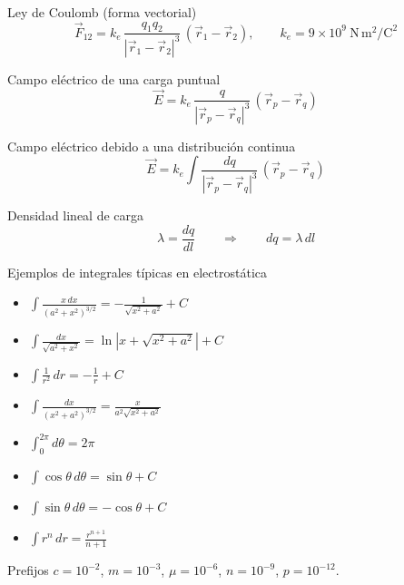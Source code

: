 \documentclass[addpoints,12pt]{exam}
\begin{document}
\begin{formbox}{Ley de Coulomb (forma vectorial)}
\[
    \vec{F}_{12} = k_e\,\frac{q_1 q_2}{|\vec{r}_1 - \vec{r}_2|^{3}}\,(\vec{r}_1 - \vec{r}_2),
    \qquad k_e = 9\times10^{9}\ \mathrm{N\,m^2/C^2}
\]
\end{formbox}

\begin{formbox}{Campo el\'ectrico de una carga puntual}
\[
    \vec{E} = k_e\,\frac{q}{|\vec{r}_p - \vec{r}_q|^{3}}\,(\vec{r}_p - \vec{r}_q)
\]
\end{formbox}

\begin{formbox}{Campo el\'ectrico debido a una distribuci\'on continua}
\[
    \vec{E} = k_e \int \frac{dq}{|\vec{r}_p - \vec{r}_q|^{3}}\,(\vec{r}_p - \vec{r}_q)
\]
\end{formbox}

\begin{formbox}{Densidad lineal de carga}
\[
    \lambda = \frac{dq}{dl} \qquad\Longrightarrow\qquad dq = \lambda\,dl
\]
\end{formbox}

\begin{formbox}{Ejemplos de integrales t\'ipicas en electrost\'atica}
\noindent
\begin{minipage}{0.52\textwidth}
\begin{itemize}\setlength\itemsep{1pt}
    \item $\displaystyle\int \frac{x\,dx}{(a^2 + x^2)^{3/2}} = -\frac{1}{\sqrt{x^2 + a^2}} + C$
    \item $\displaystyle\int \frac{dx}{\sqrt{a^2 + x^2}} = \ln\left|x + \sqrt{x^2 + a^2}\right| + C$
    \item $\displaystyle\int \frac{1}{r^2}\,dr = -\frac{1}{r} + C$
    \item $\displaystyle\int \frac{dx}{(x^2 + a^2)^{3/2}} = \frac{x}{a^2\sqrt{x^2 + a^2}}$
\end{itemize}
\end{minipage}%
\begin{minipage}{0.46\textwidth}
\begin{itemize}\setlength\itemsep{1pt}
    \item $\displaystyle\int_0^{2\pi} d\theta = 2\pi$
    \item $\displaystyle\int \cos\theta\,d\theta = \sin\theta + C$
    \item $\displaystyle\int \sin\theta\,d\theta = -\cos\theta + C$
    \item $\displaystyle\int r^n\,dr = \frac{r^{n+1}}{n+1}$
\end{itemize}
\end{minipage}
\end{formbox}

\begin{formbox}{Prefijos}
$c=10^{-2}$, \quad $m=10^{-3}$, \quad $\mu=10^{-6}$, \quad $n=10^{-9}$, \quad $p=10^{-12}$.
\end{formbox}
\end{document}
